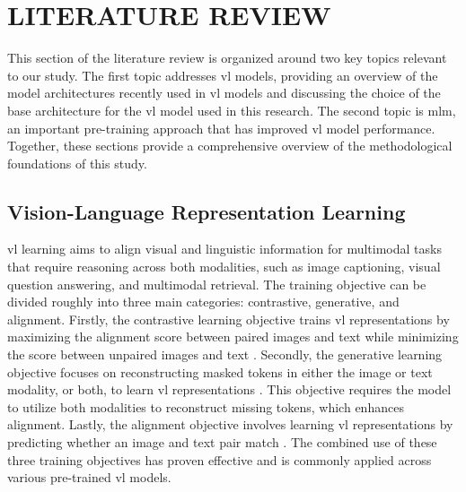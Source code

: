 \chapter{LITERATURE REVIEW}
This section of the literature review is organized around two key topics relevant to our study.  
The first topic addresses \acrshort{vl} models, providing an overview of the model architectures recently used in \acrshort{vl} models and discussing the choice of the base architecture for the \acrshort{vl} model used in this research.  
The second topic is \acrshort{mlm}, an important pre-training approach that has improved \acrshort{vl} model performance.  
Together, these sections provide a comprehensive overview of the methodological foundations of this study.  

\section{Vision-Language Representation Learning}
\Acrshort{vl} learning aims to align visual and linguistic information for multimodal tasks that require reasoning across both modalities, such as image captioning, visual question answering, and multimodal retrieval.  
The training objective can be divided roughly into three main categories: contrastive, generative, and alignment.  
Firstly, the contrastive learning objective trains \acrshort{vl} representations by maximizing the alignment score between paired images and text while minimizing the score between unpaired images and text \cite{clip, align, unicl}.  
Secondly, the generative learning objective focuses on reconstructing masked tokens in either the image or text modality, or both, to learn \acrshort{vl} representations \cite{flava, albef, flamingo}.  
This objective requires the model to utilize both modalities to reconstruct missing tokens, which enhances alignment.  
Lastly, the alignment objective involves learning \acrshort{vl} representations by predicting whether an image and text pair match \cite{vlmo}.  
The combined use of these three training objectives has proven effective and is commonly applied across various pre-trained \acrshort{vl} models.  


